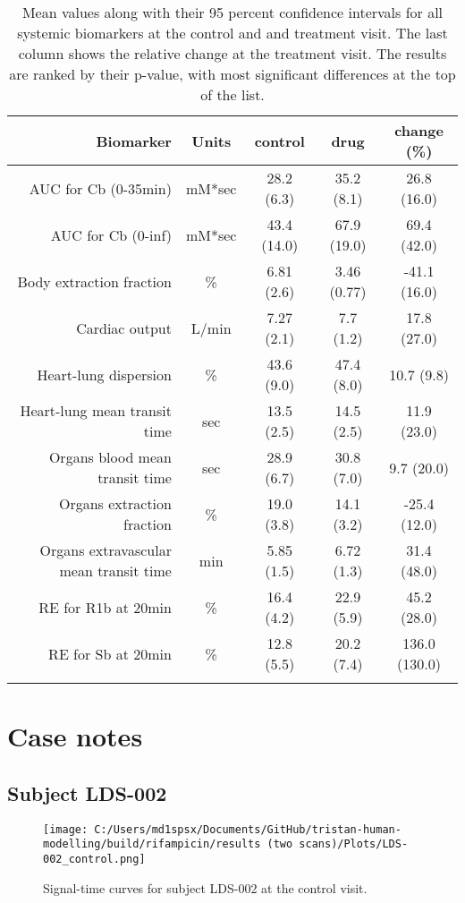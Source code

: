 \documentclass{epflreport}%
\begin{document}
\begin{longtable}{rcccc}%
\hline%
Biomarker&Units&control&drug&change (\%)\\%
\hline%
AUC for Cb (0{-}35min)&mM*sec&28.2 (6.3) &35.2 (8.1) &26.8 (16.0) \\%
AUC for Cb (0{-}inf)&mM*sec&43.4 (14.0) &67.9 (19.0) &69.4 (42.0) \\%
Body extraction fraction&\%&6.81 (2.6) &3.46 (0.77) &{-}41.1 (16.0) \\%
Cardiac output&L/min&7.27 (2.1) &7.7 (1.2) &17.8 (27.0) \\%
Heart{-}lung dispersion&\%&43.6 (9.0) &47.4 (8.0) &10.7 (9.8) \\%
Heart{-}lung mean transit time&sec&13.5 (2.5) &14.5 (2.5) &11.9 (23.0) \\%
Organs blood mean transit time&sec&28.9 (6.7) &30.8 (7.0) &9.7 (20.0) \\%
Organs extraction fraction&\%&19.0 (3.8) &14.1 (3.2) &{-}25.4 (12.0) \\%
Organs extravascular mean transit time&min&5.85 (1.5) &6.72 (1.3) &31.4 (48.0) \\%
RE for R1b at 20min&\%&16.4 (4.2) &22.9 (5.9) &45.2 (28.0) \\%
RE for Sb at 20min&\%&12.8 (5.5) &20.2 (7.4) &136.0 (130.0) \\%
\hline%
\caption{Mean values along with their 95 percent confidence intervals for all systemic biomarkers at the control and and treatment visit. The last column shows the relative change at the treatment visit. The results are ranked by their p-value, with most significant differences at the top of the list.} \\%
\end{longtable}%
\clearpage%
\section{Case notes}%
\label{sec:Casenotes}%

%
\subsection{Subject LDS{-}002}%
\label{subsec:SubjectLDS{-}002}%

%


\begin{figure}[h!]%
\centering%
\texttt{[image: C:/Users/md1spsx/Documents/GitHub/tristan-human-modelling/build/rifampicin/results (two scans)/Plots/LDS-002\_control.png]}%
\caption{Signal{-}time curves for subject LDS{-}002 at the control visit.}%
\end{figure}
\end{document}
